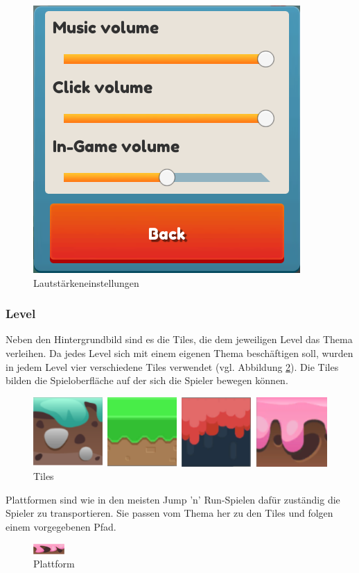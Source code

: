 \begin{figure}[H]
    \begin{center}
      \includegraphics[width=.33\linewidth]{img/realisierung/settings}
      \caption{Lautstärkeneinstellungen}
      \label{fig:realisierung:realisierung:settings}
    \end{center}
\end{figure}

\subsubsection{Level}
\label{subsubsec:implementierung:umsetzung:realisierung:level}
Neben den Hintergrundbild sind es die Tiles, die dem jeweiligen Level das Thema verleihen. Da jedes Level sich mit einem eigenen Thema beschäftigen soll, wurden in jedem Level vier verschiedene Tiles verwendet (vgl. Abbildung \ref{fig:realisierung:realisierung:level:tiles}). Die Tiles bilden die Spieloberfläche auf der sich die Spieler bewegen können. 

\begin{figure}[H]
    \begin{center}
      \includegraphics[width=.5\linewidth]{img/realisierung/assets/tiles_2}
      \caption{Tiles}
      \label{fig:realisierung:realisierung:level:tiles}
    \end{center}
\end{figure}

Plattformen sind wie in den meisten Jump 'n' Run-Spielen dafür zuständig die Spieler zu transportieren. Sie passen vom Thema her zu den Tiles und folgen einem vorgegebenen Pfad. 

\begin{figure}[H]
    \begin{center}
      \includegraphics[width=.1\linewidth]{img/realisierung/assets/plattform}
      \caption{Plattform}
      \label{fig:realisierung:realisierung:level:plattform}
    \end{center}
\end{figure}

